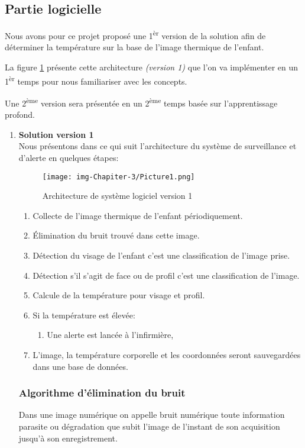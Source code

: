 \documentclass[12pt]{article}
\begin{document}
\newpage
\subsection{Partie logicielle}
Nous avons pour ce projet proposé une 1\textsuperscript{èr} version de la solution afin de déterminer la température sur la base de l'image thermique de l'enfant.

La figure \ref{fig:achdelasolu} présente cette architecture \textit{(version 1)} que l'on va implémenter en un 1\textsuperscript{èr} temps pour nous familiariser avec les concepts.

Une 2\textsuperscript{ème} version sera présentée en un 2\textsuperscript{ème} temps basée sur l'apprentissage profond.\\

\begin{enumerate}
	\item \textbf{Solution version 1}\\
	Nous présentons dans ce qui suit l'architecture du système de surveillance et d'alerte  en quelques étapes:
	\newpage
\begin{figure}[h]
	\centering
	\texttt{[image: img-Chapiter-3/Picture1.png]}
	\caption{Architecture de système logiciel version 1}
	\label{fig:achdelasolu}
\end{figure}
\begin{enumerate}
	\item Collecte de l’image thermique de l’enfant périodiquement.
	\item \' Elimination du bruit trouvé dans cette image.
	\item Détection du visage de l’enfant c'est une classification de l’image prise.
	\item Détection s’il s’agit  de face ou de profil c'est une classification de l’image.
	\item Calcule de la température pour visage et profil. 
	\item Si la température est élevée:
	\begin{enumerate}
		\item Une alerte est lancée à l’infirmière,
	\end{enumerate}
	\item L'image, la température corporelle et les coordonnées seront sauvegardées dans une base de données.
\end{enumerate}

\subsubsection{Algorithme d'élimination du bruit}
Dans une image numérique on appelle bruit numérique toute information parasite ou dégradation que subit l'image de l'instant de son acquisition jusqu'à son enregistrement. 


\end{enumerate}
\end{document}
